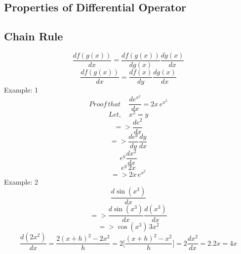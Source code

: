 	\subsection{Properties of Differential Operator}
	\subsection{Chain Rule}
	
	\begin{displaymath}
	\frac{df(g(x))}{dx} = \frac{df(g(x))}{dg(x)}\frac{dy(x)}{dx}
	\end{displaymath}
	\begin{equation}
	\frac{df(g(x))}{dx} = \frac{df(x)}{dy}\frac{dg(x)}{dx}
	\end{equation}
	\newline
	Example: 1
	\begin{equation}
	Proof\,that\, \quad\frac{de^{x^2}}{dx} = 2x \, e^{x^2}
	\end{equation}
	\begin{displaymath}
	Let, \quad x^2 = y
	\end{displaymath}
	\begin{displaymath}
	=> \frac{de^2}{dx}
	\end{displaymath}
	\begin{displaymath}
	=> \frac{de^y}{dy}\frac{dy}{dx}
	\end{displaymath}
	\begin{displaymath}
	e^y\frac{dx^2}{dx}
	\end{displaymath}
	\begin{displaymath}
	e^y\,2x
	\end{displaymath}
	\begin{displaymath}
	=> 2x\,e^{x^2}
	\end{displaymath}	
	\newline
	Example: 2
	\begin{displaymath}
	\frac{d\sin(x^3)}{dx}
	\end{displaymath}	 
	\begin{displaymath}
	=> \frac{d \sin(x^3)}{dx}\frac{d(x^3)}{dx}
	\end{displaymath}
	\begin{displaymath}
	=> \cos(x^3) \,3x^2
	\end{displaymath}
	\newline
	\begin{equation}
	\frac{d(2x^2)}{dx} = \frac{2(x+h)^2-2x^2}{h} = 2\Big[\frac{(x+h)^2-x^2}{h}\Big] = 2\frac{dx^2}{dx}=2.2x=4x
	\end{equation}
